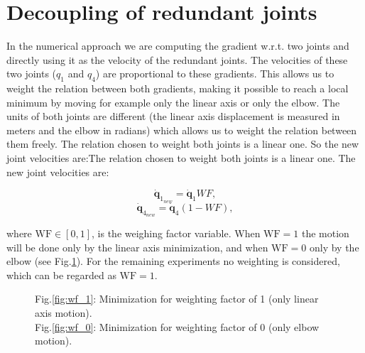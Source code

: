 \section{Decoupling of redundant joints}
\label{sec:Decoupling}
\label{subsubsec:weighting}




In the numerical approach we are computing the gradient w.r.t. two joints and directly using it as the velocity of the redundant joints. The velocities of these two joints ($q_1$ and $q_4$) are proportional to these gradients. This allows us to weight the relation between both gradients, making it possible to reach a local minimum
by moving for example only the linear axis or only the elbow. The units of both joints are different (the linear axis displacement is measured in meters and the elbow in radians) which allows us to weight the relation between them freely.
The relation chosen to weight both joints is a linear one. So the new joint velocities are:The relation chosen to weight both joints is a linear one. The new joint velocities are:

\begin{equation}
	\mathbf{\dot{q}}_{1_{new}}  = \mathbf{\dot{q}}_{1}WF,
	\label{eq:decoupling_q1} 
\end{equation} 
\begin{equation}
	\mathbf{\dot{q}}_{4_{new}} = \mathbf{\dot{q}}_{4}(1-WF),
	\label{eq:decoupling_q4}
\end{equation}


where $\mathrm{WF \in [0,1]}$, is the weighing factor variable.
When $\mathrm{WF=1}$ the motion will be done only by the linear axis minimization, and when $\mathrm{WF=0}$ only by the elbow (see Fig.\ref{fig:wf}).
For the  remaining experiments no weighting is considered, which can be regarded as $\mathrm{WF=1}$.

\begin{figure}[!h]
	\centering	
	 	 	 	
	\caption{Fig.\ref{fig:wf_1}:  Minimization for weighting factor of 1 (only  linear axis motion). \\ Fig.\ref{fig:wf_0}: Minimization for weighting factor of 0 (only elbow motion). }
	\label{fig:wf}
\end{figure}

